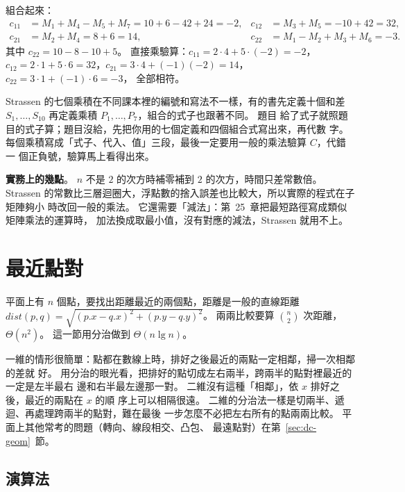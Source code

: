 組合起來：
\[
\begin{aligned}
c_{11} &= M_1 + M_4 - M_5 + M_7 = 10 + 6 - 42 + 24 = -2, &
c_{12} &= M_3 + M_5 = -10 + 42 = 32, \\
c_{21} &= M_2 + M_4 = 8 + 6 = 14, &
c_{22} &= M_1 - M_2 + M_3 + M_6 = -3.
\end{aligned}
\]
其中 $c_{22} = 10 - 8 - 10 + 5$。 直接乘驗算：$c_{11} = 2 \cdot 4 + 5 \cdot (-2) = -2$，$c_{12} = 2 \cdot 1 + 5 \cdot 6 =
32$，$c_{21} = 3 \cdot 4 + (-1)(-2) = 14$，$c_{22} = 3 \cdot 1 + (-1) \cdot 6 = -3$，
全部相符。

\begin{examnote}
Strassen 的七個乘積在不同課本裡的編號和寫法不一樣，有的書先定義十個和差
$S_1, \ldots, S_{10}$ 再定義乘積 $P_1, \ldots, P_7$，組合的式子也跟著不同。 題目
給了式子就照題目的式子算；題目沒給，先把你用的七個定義和四個組合式寫出來，再代數
字。 每個乘積寫成「式子、代入、值」三段，最後一定要用一般的乘法驗算 $C$，代錯一
個正負號，驗算馬上看得出來。
\end{examnote}

\textbf{實務上的幾點}。 $n$ 不是 $2$ 的次方時補零補到 $2$ 的次方，時間只差常數倍。
Strassen 的常數比三層迴圈大，浮點數的捨入誤差也比較大，所以實際的程式在子矩陣夠小
時改回一般的乘法。 它還需要「減法」：第~25~章把最短路徑寫成類似矩陣乘法的運算時，
加法換成取最小值，沒有對應的減法，Strassen 就用不上。

\section{最近點對}
\label{sec:dc-closest}

平面上有 $n$ 個點，要找出距離最近的兩個點，距離是一般的直線距離
$\mathit{dist}(p, q) = \sqrt{(p.x - q.x)^2 + (p.y - q.y)^2}$。 兩兩比較要算
$\binom{n}{2}$ 次距離，$\Theta(n^2)$。 這一節用分治做到 $\Theta(n \lg n)$。

一維的情形很簡單：點都在數線上時，排好之後最近的兩點一定相鄰，掃一次相鄰的差就
好。 用分治的眼光看，把排好的點切成左右兩半，跨兩半的點對裡最近的一定是左半最右
邊和右半最左邊那一對。 二維沒有這種「相鄰」，依 $x$ 排好之後，最近的兩點在 $x$ 的順
序上可以相隔很遠。 二維的分治法一樣是切兩半、遞迴、再處理跨兩半的點對，難在最後
一步怎麼不必把左右所有的點兩兩比較。 平面上其他常考的問題（轉向、線段相交、凸包、
最遠點對）在第~\ref{sec:dc-geom}~節。

\subsection{演算法}

